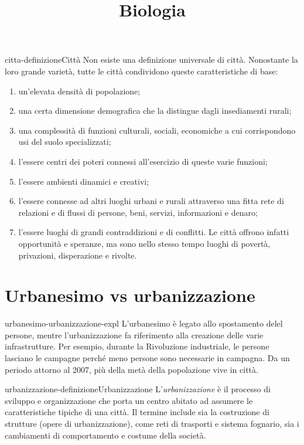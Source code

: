 \documentclass[preview]{standalone}
\begin{document}
\title{Biologia}
\genpage

\begin{snippetdefinition}{citta-definizione}{Città}
    Non esiste una definizione universale di città.
    Nonostante la loro grande varietà, tutte le città condividono queste
    caratteristiche di base:
    \begin{enumerate}
        \item un'elevata densità di popolazione;
        \item una certa dimensione demografica che la distingue dagli
        insediamenti rurali;
        \item una complessità di funzioni culturali, sociali, economiche a cui
        corrispondono usi del suolo specializzati;
        \item l'essere centri dei poteri connessi all'esercizio di queste varie
        funzioni;
        \item l'essere ambienti dinamici e creativi;
        \item l'essere connesse ad altri luoghi urbani e rurali attraverso una
        fitta rete di relazioni e di flussi di persone, beni, servizi,
        informazioni e denaro;
        \item l'essere luoghi di grandi contraddizioni e di conflitti. Le città
        offrono infatti opportunità e speranze, ma sono nello stesso
        tempo luoghi di povertà, privazioni, disperazione e rivolte.
    \end{enumerate}
\end{snippetdefinition}

\section{Urbanesimo vs urbanizzazione}

\begin{snippet}{urbanesimo-urbanizzazione-expl}
    L'urbanesimo è legato allo spostamento delel persone,
    mentre l'urbanizzazione fa riferimento alla creazione delle varie infrastrutture.
    Per esempio, durante la Rivoluzione industriale, le persone lasciano le campagne
    perché meno persone sono necessarie in campagna.
    Da un periodo attorno al 2007, più della metà della popolazione vive in città.
\end{snippet}

\begin{snippetdefinition}{urbanizzazione-definizione}{Urbanizzazione}
    L'\textit{urbanizzazione} è il processo di sviluppo e organizzazione
    che porta un centro abitato ad assumere le caratteristiche tipiche di una città.
    Il termine include sia la costruzione di strutture (opere di urbanizzazione),
    come reti di trasporti e sistema fognario, sia i cambiamenti di comportamento e
    costume della società. 
\end{snippetdefinition}
\end{document}

